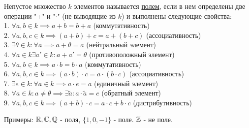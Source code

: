 \documentclass[../main.tex]{subfiles}
\begin{document}
Непустое множество $k$ элементов называется \underline{полем}, если в нем определены две операции "+" и "$\cdot$" (не выводящие из $k$) и выполнены  следующие свойства: 
\\1. $\forall a,b \in k \implies a+b=b+a$ (коммутативность)
\\2. $\forall a,b,c \in k \implies (a+b)+c=a+(b+c)$ (ассоциативность)
\\3. $\exists \theta \in k: \forall a \implies a+ \theta= a$ (нейтральный элемент)
\\4. $\forall a \in k \exists a' \in k: a+a'=\theta$ (противоположный элемент)
\\5. $\forall a,b \in k\implies a\cdot b= b\cdot a$ (коммутативность)
\\6. $\forall a,b,c \in k \implies (a\cdot b)\cdot c=a\cdot(b\cdot c)$ (ассоциативность)
\\7. $\exists e \in k: \forall a \in k \implies a\cdot e = a$ (единичный элемент)
\\8. $\forall a \in k: a \neq  \theta \implies \exists \tilde{a}: a\cdot \tilde{a}=e$ (обратный элемент)
\\9. $\forall a,b,c \in k \implies (a+b)\cdot c = a\cdot c + b\cdot c$ (дистрибутивность)

Примеры: $\mathbb{R}, \mathbb{C}, \mathbb{Q}$ - поля, $\{1,0,-1\}$ - поле. $\mathbb{Z}$ - не поле.
\end{document}
